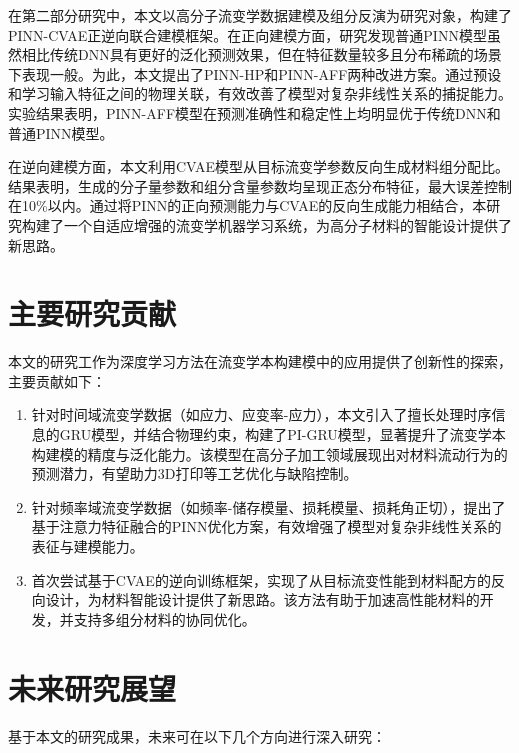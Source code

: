 在第二部分研究中，本文以高分子流变学数据建模及组分反演为研究对象，构建了PINN-CVAE正逆向联合建模框架。在正向建模方面，研究发现普通PINN模型虽然相比传统DNN具有更好的泛化预测效果，但在特征数量较多且分布稀疏的场景下表现一般。为此，本文提出了PINN-HP和PINN-AFF两种改进方案。通过预设和学习输入特征之间的物理关联，有效改善了模型对复杂非线性关系的捕捉能力。实验结果表明，PINN-AFF模型在预测准确性和稳定性上均明显优于传统DNN和普通PINN模型。

在逆向建模方面，本文利用CVAE模型从目标流变学参数反向生成材料组分配比。结果表明，生成的分子量参数和组分含量参数均呈现正态分布特征，最大误差控制在10\%以内。通过将PINN的正向预测能力与CVAE的反向生成能力相结合，本研究构建了一个自适应增强的流变学机器学习系统，为高分子材料的智能设计提供了新思路。

\section*{主要研究贡献}
本文的研究工作为深度学习方法在流变学本构建模中的应用提供了创新性的探索，主要贡献如下：

\begin{enumerate}[topsep = 0 pt, itemsep= 0 pt, parsep=0pt, partopsep=0pt, leftmargin=0pt, itemindent=44pt, labelsep=6pt, label=(\arabic*)]
  \item 针对时间域流变学数据（如应力、应变率-应力），本文引入了擅长处理时序信息的GRU模型，并结合物理约束，构建了PI-GRU模型，显著提升了流变学本构建模的精度与泛化能力。该模型在高分子加工领域展现出对材料流动行为的预测潜力，有望助力3D打印等工艺优化与缺陷控制。
  \item 针对频率域流变学数据（如频率-储存模量、损耗模量、损耗角正切），提出了基于注意力特征融合的PINN优化方案，有效增强了模型对复杂非线性关系的表征与建模能力。
  \item 首次尝试基于CVAE的逆向训练框架，实现了从目标流变性能到材料配方的反向设计，为材料智能设计提供了新思路。该方法有助于加速高性能材料的开发，并支持多组分材料的协同优化。
\end{enumerate}

\section*{未来研究展望}
基于本文的研究成果，未来可在以下几个方向进行深入研究：

